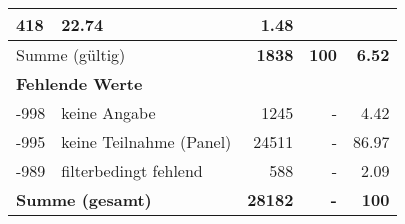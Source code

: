 \begin{longtable}{lXrrr}
       \num{418} &
       \num[round-mode=places,round-precision=2]{22.74} &
         \num[round-mode=places,round-precision=2]{1.48} \\
     \midrule
     \multicolumn{2}{l}{Summe (gültig)} &
       \textbf{\num{1838}} &
     \textbf{\num{100}} &
       \textbf{\num[round-mode=places,round-precision=2]{6.52}} \\
     \multicolumn{5}{l}{\textbf{Fehlende Werte}}\\
       -998 &
       keine Angabe &
         \num{1245} &
        - &
         \num[round-mode=places,round-precision=2]{4.42} \\
       -995 &
       keine Teilnahme (Panel) &
         \num{24511} &
        - &
         \num[round-mode=places,round-precision=2]{86.97} \\
       -989 &
       filterbedingt fehlend &
         \num{588} &
        - &
         \num[round-mode=places,round-precision=2]{2.09} \\
     \midrule
     \multicolumn{2}{l}{\textbf{Summe (gesamt)}} &
          \textbf{\num{28182}} &
        \textbf{-} &
        \textbf{\num{100}} \\
     \bottomrule
     \end{longtable}
     
